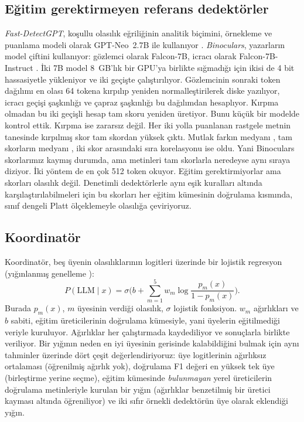 \documentclass[journal]{IEEEtran}
\begin{document}
\subsection{Eğitim gerektirmeyen referans dedektörler}
\emph{Fast-DetectGPT}, koşullu olasılık eğriliğinin analitik biçimini, örnekleme ve puanlama modeli olarak
GPT-Neo~2.7B ile kullanıyor \cite{Bao_2024}. \emph{Binoculars}, yazarların model çiftini kullanıyor: gözlemci olarak
Falcon-7B, icracı olarak Falcon-7B-Instruct \cite{Hans_2024}. İki 7B model 8~GB'lık bir GPU'ya birlikte sığmadığı
için ikisi de 4 bit hassasiyetle yükleniyor ve iki geçişte çalıştırılıyor. Gözlemcinin sonraki token dağılımı en
olası 64 tokena kırpılıp yeniden normalleştirilerek diske yazılıyor, icracı geçişi şaşkınlığı ve çapraz şaşkınlığı
bu dağılımdan hesaplıyor. Kırpma olmadan bu iki geçişli hesap tam skoru yeniden üretiyor. Bunu küçük bir modelde
kontrol ettik. Kırpma ise zararsız değil. Her iki yolla puanlanan \NBinoCheck{} rastgele metnin \BinoHigher{}
tanesinde kırpılmış skor tam skordan yüksek çıktı. Mutlak farkın medyanı \BinoMedDiff{}, tam skorların medyanı
\BinoMedScore{}, iki skor arasındaki sıra korelasyonu ise \BinoRho{} oldu. Yani Binoculars skorlarımız kaymış
durumda, ama metinleri tam skorlarla neredeyse aynı sıraya diziyor. İki yöntem de en çok 512 token okuyor. Eğitim
gerektirmiyorlar ama skorları olasılık değil. Denetimli dedektörlerle aynı eşik kuralları altında
karşılaştırılabilmeleri için bu skorları her eğitim kümesinin doğrulama kısmında, sınıf dengeli Platt ölçeklemeyle
olasılığa çeviriyoruz.

\subsection{Koordinatör}
Koordinatör, beş üyenin olasılıklarının logitleri üzerinde bir lojistik regresyon (yığınlanmış genelleme
\cite{Wolpert_1992}):
\begin{equation}
P(\text{LLM} \mid x) = \sigma\Big(b + \sum_{m=1}^{5} w_m \log\frac{p_m(x)}{1 - p_m(x)}\Big).
\end{equation}
Burada $p_m(x)$, $m$ üyesinin verdiği olasılık, $\sigma$ lojistik fonksiyon. $w_m$ ağırlıkları ve $b$ sabiti, eğitim
üreticilerinin doğrulama kümesiyle, yani üyelerin eğitilmediği veriyle kuruluyor. Ağırlıklar her çalıştırmada
kaydediliyor ve sonuçlarla birlikte veriliyor. Bir yığının neden en iyi üyesinin gerisinde kalabildiğini bulmak
için aynı tahminler üzerinde dört çeşit değerlendiriyoruz: üye logitlerinin ağırlıksız ortalaması (öğrenilmiş
ağırlık yok), doğrulama F1 değeri en yüksek tek üye (birleştirme yerine seçme), eğitim kümesinde \emph{bulunmayan}
yerel üreticilerin doğrulama metinleriyle kurulan bir yığın (ağırlıklar benzetilmiş bir üretici kayması altında
öğreniliyor) ve iki sıfır örnekli dedektörün üye olarak eklendiği yığın.
\end{document}

